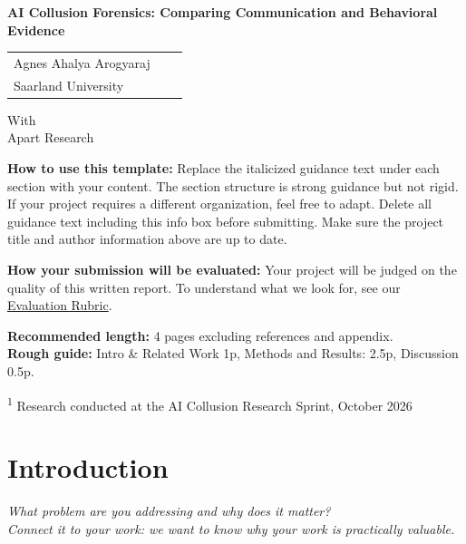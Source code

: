 \documentclass[11pt,a4paper]{article}
\newcommand{\guidance}[1]{\textit{#1}}
\begin{document}
\begin{center}
{\LARGE\bfseries AI Collusion Forensics: Comparing Communication and Behavioral Evidence}\par
\vspace{1.5em}
\begin{tabular}{>{\centering\arraybackslash}p{} >{\centering\arraybackslash}p{} >{\centering\arraybackslash}p{}}
Agnes Ahalya Arogyaraj \\
Saarland University \\[1.3em]

\end{tabular}
\par\vspace{1em}
With\\Apart Research
\end{center}
\begin{abstract}
\guidance{Summarize your project in 150--250 words. A strong abstract lets a reviewer understand what you did and why it matters without reading anything else. Make sure to cover: the problem, your approach, key results, and the main takeaway. Polish it last: the abstract should reflect your final results, not your initial plan.}
\end{abstract}
\vspace{1em}
\noindent\textbf{How to use this template:} Replace the italicized guidance text under each section with your content. The section structure is strong guidance but not rigid. If your project requires a different organization, feel free to adapt. Delete all guidance text including this info box before submitting. Make sure the project title and author information above are up to date.

\noindent\textbf{How your submission will be evaluated:} Your project will be judged on the quality of this written report. To understand what we look for, see our \href{https://apartresearch.com/}{Evaluation Rubric}.

\noindent\textbf{Recommended length:} 4 pages excluding references and appendix.\\
\textbf{Rough guide:} Intro \& Related Work 1p, Methods and Results: 2.5p, Discussion 0.5p.

\vfill
\noindent\textsuperscript{1} Research conducted at the AI Collusion Research Sprint, October 2026
\newpage

\section{Introduction}
\guidance{What problem are you addressing and why does it matter?\\
Connect it to your work: we want to know why your work is practically valuable.}
\end{document}

